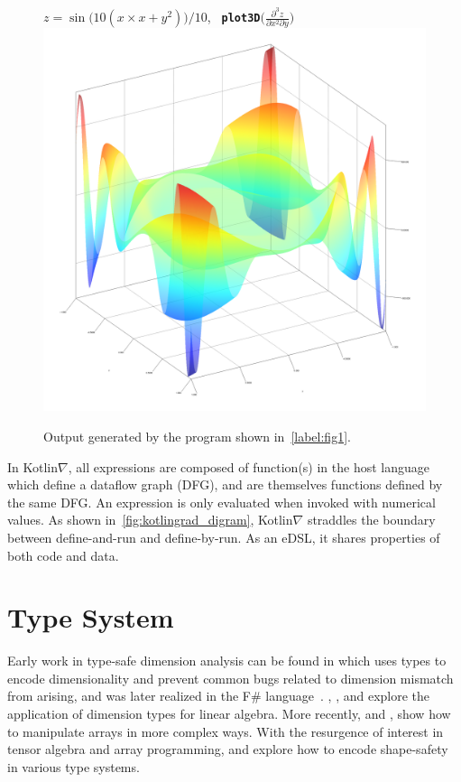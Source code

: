 \documentclass{article}
\begin{document}
\begin{figure}[!htb]
              \centering $z = \sin{\big(10(x \times x + y^2)\big)} / 10$, \textbf{\texttt{ plot3D}}$\Big(\frac{\partial^3z}{\partial{x^2}\partial{y}}\Big)$
              \includegraphics[scale=0.43]{../figures/../figures/plot_result.png}
              \caption{Output generated by the program shown in~\autoref{label:fig1}.}
\end{figure}

In Kotlin$\nabla$, all expressions are composed of function(s) in the host language which define a dataflow graph (DFG), and are themselves functions defined by the same DFG. An expression is only evaluated when invoked with numerical values. As shown in~\autoref{fig:kotlingrad_digram}, Kotlin$\nabla$ straddles the boundary between define-and-run and define-by-run. As an eDSL, it shares properties of both code and data.

\section{Type System}

Early work in type-safe dimension analysis can be found in \citet{kennedy1994dimension, kennedy1996programming} which uses types to encode dimensionality and prevent common bugs related to dimension mismatch from arising, and was later realized in the F\# language~\citep{kennedy2010types}. \citet{jay1996shape}, \citet{rittri1995dimension}, and \citet{zenger1997indexed} explore the application of dimension types for linear algebra. More recently, \citet{kiselyov2005number, kiselyov2010fun} and \citet{griffioen2015type}, show how to manipulate arrays in more complex ways. With the resurgence of interest in tensor algebra and array programming, \citet{chen2017typesafe} and \citet{rink2018modeling} explore how to encode shape-safety in various type systems.
\end{document}
